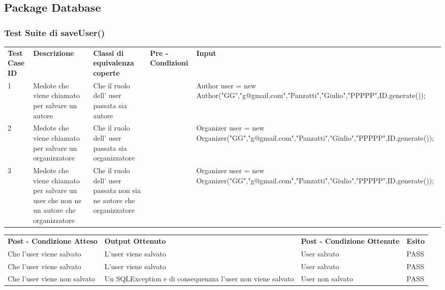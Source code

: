 \subsection{Package Database}
\label{sec:test_funzionale_package_database}

\subsubsection{Test Suite di saveUser()}
\begin{tabular}{|p{2.5cm}|p{2.5cm}|p{3cm}|p{1.5cm}|p{5cm}|}
\hline
\rowcolor{SkyBlue}
\multicolumn{5}{l}{\textbf{p1}}\\
\hline
\rowcolor{Red}
\textbf{Test Case ID} & \textbf{Descrizione} & \textbf{Classi di equivalenza coperte} & \textbf{Pre - Condizioni} & \textbf{Input} \\
\hline
1&Medote che viene chiamato per salvare un autore&Che il ruolo dell' user passata sia autore&&Author user = new Author("GG","g@gmail.com","Panzatti","Giulio","PPPPP",ID.generate());\\
\hline
2&Medote che viene chiamato per salvare un organizzatore&Che il ruolo dell' user passata sia organizzatore&&Organizer user = new Organizer("GG","g@gmail.com","Panzatti","Giulio","PPPPP",ID.generate());\\
\hline
3&Medote che viene chiamato per salvare un user che non ne un autore che organizzatore&Che il ruolo dell' user passata non sia ne autore che organizzatore&&Organizer user = new Organizer("GG","g@gmail.com","Panzatti","Giulio","PPPPP",ID.generate());\\
\hline
\end{tabular}


\begin{tabular}{|p{3.5cm}|p{3cm}|p{3cm}|p{1cm}|}
\hline
\rowcolor{SkyBlue}
\multicolumn{4}{l}{\textbf{p2}}\\
\hline
\rowcolor{Red}
 \textbf{Post - Condizione Atteso} & \textbf{Output Ottenuto}& \textbf{Post - Condizione Ottenute}& \textbf{Esito}\\
\hline
Che l'user viene salvato&L'user viene salvato&User salvato&PASS\\
\hline
Che l'user viene salvato&L'user viene salvato&User salvato&PASS\\
\hline
Che l'user viene non salvato& Un SQLException e di consequenzza l'user non viene salvato&User non salvato&PASS\\
\hline
\end{tabular}

